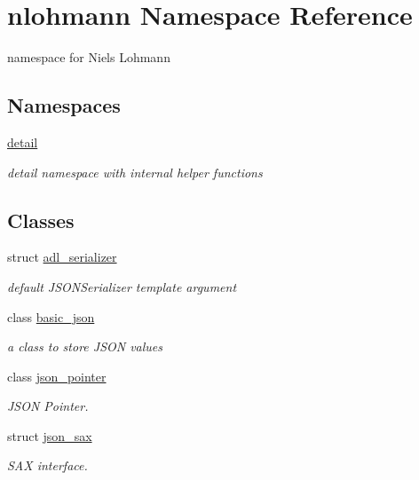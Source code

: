 \hypertarget{namespacenlohmann}{}\section{nlohmann Namespace Reference}
\label{namespacenlohmann}


namespace for Niels Lohmann  


\subsection*{Namespaces}
\begin{DoxyCompactItemize}
\item 
 \mbox{\hyperlink{namespacenlohmann_1_1detail}{detail}}
\begin{DoxyCompactList}\small\item\em detail namespace with internal helper functions \end{DoxyCompactList}\end{DoxyCompactItemize}
\subsection*{Classes}
\begin{DoxyCompactItemize}
\item 
struct \mbox{\hyperlink{structnlohmann_1_1adl__serializer}{adl\+\_\+serializer}}
\begin{DoxyCompactList}\small\item\em default J\+S\+O\+N\+Serializer template argument \end{DoxyCompactList}\item 
class \mbox{\hyperlink{classnlohmann_1_1basic__json}{basic\+\_\+json}}
\begin{DoxyCompactList}\small\item\em a class to store J\+S\+ON values \end{DoxyCompactList}\item 
class \mbox{\hyperlink{classnlohmann_1_1json__pointer}{json\+\_\+pointer}}
\begin{DoxyCompactList}\small\item\em J\+S\+ON Pointer. \end{DoxyCompactList}\item 
struct \mbox{\hyperlink{structnlohmann_1_1json__sax}{json\+\_\+sax}}
\begin{DoxyCompactList}\small\item\em S\+AX interface. \end{DoxyCompactList}\end{DoxyCompactItemize}
